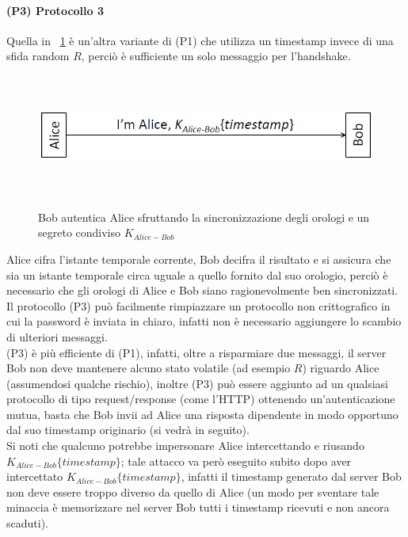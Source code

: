 \paragraph{(P3) Protocollo 3}
Quella in \figurename~\ref{fig:ImgS20bis} è un'altra variante di (P1) che utilizza un timestamp invece di una sfida random $R$, perciò è sufficiente un solo messaggio per l'handshake.
\begin{figure}[htbp]
	\centering%
	\subfigure%
	{\includegraphics[height=4cm, width=12cm, keepaspectratio]{Immagini/autenticazione/ImgS20bis.png}}
	\caption{Bob autentica Alice sfruttando la sincronizzazione degli orologi e un segreto condiviso $K_{Alice-Bob}$\label{fig:ImgS20bis}} 	
\end{figure}
Alice cifra l'istante temporale corrente, Bob decifra il risultato e si assicura che sia un istante temporale circa uguale a quello fornito dal suo orologio, perciò è necessario che gli orologi di Alice e Bob siano ragionevolmente ben sincronizzati.\\
Il protocollo (P3) può facilmente rimpiazzare un protocollo non crittografico in cui la password è inviata in chiaro, infatti non è necessario aggiungere lo scambio di ulteriori messaggi.\\
(P3) è più efficiente di (P1), infatti, oltre a risparmiare due messaggi, il server Bob non deve mantenere alcuno stato volatile (ad esempio $R$) riguardo Alice (assumendosi qualche rischio), inoltre (P3) può essere aggiunto ad un qualsiasi protocollo di tipo request/response (come l'HTTP) ottenendo un'autenticazione mutua, basta che Bob invii ad Alice una risposta dipendente in modo opportuno dal suo timestamp originario (si vedrà in seguito). \\
Si noti che qualcuno potrebbe impersonare Alice intercettando e riusando $K_{Alice-Bob}\lbrace timestamp\rbrace$; tale attacco va però eseguito subito dopo aver intercettato $K_{Alice-Bob}\lbrace timestamp\rbrace$, infatti il timestamp generato dal server Bob non deve essere troppo diverso da quello di Alice (un modo per sventare tale minaccia è memorizzare nel server Bob tutti i timestamp ricevuti e non ancora scaduti). \\
